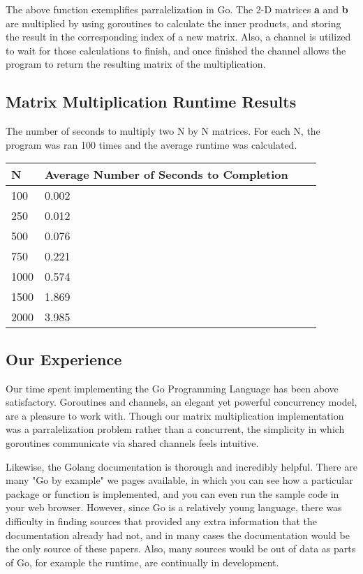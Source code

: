 The above function exemplifies parralelization in Go. The 2-D matrices \textbf{a} and \textbf{b} are multiplied by using goroutines to calculate the inner products, and storing the result in the corresponding index of a new matrix. Also, a channel is utilized to wait for those calculations to finish, and once finished the channel allows the program to return the resulting matrix of the multiplication. 
\subsection{Matrix Multiplication Runtime Results}
The number of seconds to multiply two N by N matrices. For each N, the program was ran 100 times and the average runtime was calculated.
\begin{center}
    \begin{tabular}{ | l | l | l | p{5cm} |}
    \hline
    N & Average Number of Seconds to Completion \\ \hline
    100 & 0.002 \\ \hline
    250 & 0.012 \\ \hline
    500 & 0.076 \\ \hline
    750 & 0.221 \\ \hline
    1000 & 0.574 \\ \hline
    1500 & 1.869 \\ \hline
    2000 & 3.985 \\ \hline
    
    \hline
    \end{tabular}
\end{center}
\subsection{Our Experience}
Our time spent implementing the Go Programming Language has been above satisfactory. Goroutines and channels, an elegant yet powerful concurrency model, are a pleasure to work with. Though our matrix multiplication implementation was a parralelization problem rather than a concurrent, the simplicity in which goroutines communicate via shared channels feels intuitive.

Likewise, the Golang documentation is thorough and incredibly helpful. There are many "Go by example" we pages available, in which you can see how a particular package or function is implemented, and you can even run the sample code in your web browser. However, since Go is a relatively young language, there was difficulty in finding sources that provided any extra information that the documentation already had not, and in many cases the documentation would be the only source of these papers. Also, many sources would be out of data as parts of Go, for example the runtime, are continually in development.

